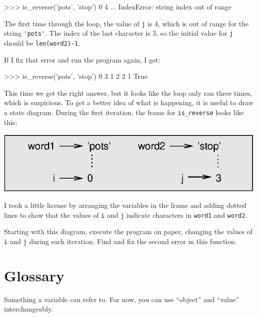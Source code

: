 \beforeverb
\begin{pycode}
>>> is_reverse('pots', 'stop')
0 4
...
IndexError: string index out of range
\end{pycode}
\afterverb
%
The first time through the loop, the value of {\tt j} is 4,
which is out of range for the string \verb"'pots'".
The index of the last character is 3, so the
initial value for {\tt j} should be {\tt len(word2)-1}.


If I fix that error and run the program again, I get:

\beforeverb
\begin{pycode}
>>> is_reverse('pots', 'stop')
0 3
1 2
2 1
True
\end{pycode}
\afterverb
%
This time we get the right answer, but it looks like the loop only ran
three times, which is suspicious.  To get a better idea of what is
happening, it is useful to draw a state diagram.  During the first
iteration, the frame for \verb"is_reverse" looks like this:


\beforefig
\centerline{\includegraphics{figs/state4.eps}}
\afterfig

I took a little license by arranging the variables in the frame
and adding dotted lines to show that the values of {\tt i} and
{\tt j} indicate characters in {\tt word1} and {\tt word2}.

\begin{exercise}
\label{is_reverse}
Starting with this diagram, execute the program on paper, changing the
values of {\tt i} and {\tt j} during each iteration.  Find and fix the
second error in this function.
\end{exercise}



\section{Glossary}
	
\begin{vocabulary}[object:] Something a variable can refer to.  For now,
you can use ``object'' and ``value'' interchangeably.
\end{vocabulary}
	
